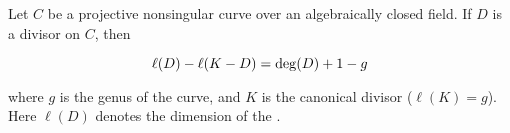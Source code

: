 \documentclass[12pt]{article}
\begin{document}
Let $C$ be a projective nonsingular curve over an algebraically closed field.  If $D$ is a divisor on $C$, then

$$\ell(D) - \ell(K-D) = {\rm deg}(D) + 1 - g$$

where $g$ is the genus of the curve, and $K$ is the canonical divisor ($\ell(K)=g$).  Here $\ell(D)$ denotes the dimension of the .
\end{document}
